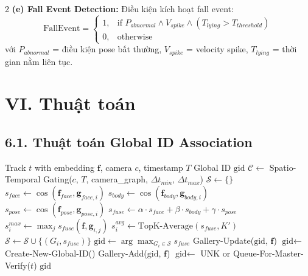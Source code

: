 \documentclass[a4paper,13pt]{article}
\begin{document}
\begin{multicols}{2}
\textbf{(e) Fall Event Detection:}
Điều kiện kích hoạt fall event:
\begin{equation}
\text{FallEvent} = \begin{cases}
1, & \text{if } P_{abnormal} \wedge V_{spike} \wedge (T_{lying} > T_{threshold}) \\
0, & \text{otherwise}
\end{cases}
\label{eq:fall}
\end{equation}
với $P_{abnormal}$ = điều kiện pose bất thường, $V_{spike}$ = velocity spike, $T_{lying}$ = thời gian nằm liên tục.

\section*{VI. Thuật toán}

\subsection*{6.1. Thuật toán Global ID Association}

\begin{algorithm}[H]
\caption{Online Global ID Association (Master--Slave)}
\label{alg:reid}
\begin{algorithmic}[1]
\REQUIRE Track $t$ with embedding $\mathbf{f}$, camera $c$, timestamp $T$
\ENSURE Global ID $\text{gid}$
\STATE $\mathcal{C} \gets$ Spatio-Temporal Gating($c$, $T$, camera\_graph, $\Delta t_{min}$, $\Delta t_{max}$)
\STATE $\mathcal{S} \gets \{\}$ 
    \STATE $s_{face} \gets \cos(\mathbf{f}_{face}, \mathbf{g}_{face,i})$
    \STATE $s_{body} \gets \cos(\mathbf{f}_{body}, \mathbf{g}_{body,i})$
    \STATE $s_{pose} \gets \cos(\mathbf{f}_{pose}, \mathbf{g}_{pose,i})$
    \STATE $s_{fuse} \gets \alpha \cdot s_{face} + \beta \cdot s_{body} + \gamma \cdot s_{pose}$
    \STATE $s^{max}_i \gets \max_{j} s_{fuse}(\mathbf{f}, \mathbf{g}_{i,j})$
    \STATE $s^{avg}_i \gets \text{TopK-Average}(s_{fuse}, K')$
        \STATE $\mathcal{S} \gets \mathcal{S} \cup \{(G_i, s_{fuse})\}$
    \ENDIF
\ENDFOR
{}
    \STATE $\text{gid} \gets \arg\max_{G_i \in \mathcal{S}} s_{fuse}$
    \STATE Gallery-Update($\text{gid}$, $\mathbf{f}$)
\ELSE
        \STATE $\text{gid} \gets$ Create-New-Global-ID()
        \STATE Gallery-Add($\text{gid}$, $\mathbf{f}$)
    \ELSE
        \STATE $\text{gid} \gets$ UNK or Queue-For-Master-Verify($t$)
    \ENDIF
\ENDIF
\RETURN $\text{gid}$
\end{algorithmic}
\end{algorithm}


\end{multicols}
\end{document}
